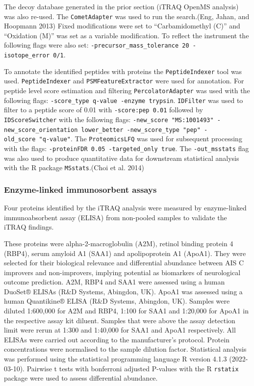 \documentclass[9pt,lineno]{elife}
\begin{document}
The decoy database generated in the prior section (iTRAQ OpenMS analysis) was also re-used.
The \texttt{CometAdapter} was used to run the search.(Eng, Jahan, and Hoopmann 2013)
Fixed modifications were set to ``Carbamidomethyl (C)'' and ``Oxidation (M)'' was set as a variable modification.
To reflect the instrument the following flags were also set: \texttt{-precursor\_mass\_tolerance\ 20\ -isotope\_error\ 0/1}.

To annotate the identified peptides with proteins the \texttt{PeptideIndexer} tool was used.
\texttt{PeptideIndexer} and \texttt{PSMFeatureExtractor} were used for annotation.
For peptide level score estimation and filtering \texttt{PercolatorAdapter} was used with the following flags: \texttt{-score\_type\ q-value\ -enzyme\ trypsin}.
\texttt{IDFilter} was used to filter to a peptide score of 0.01 with \texttt{-score:pep\ 0.01} followed by \texttt{IDScoreSwitcher} with the following flags: \texttt{-new\_score\ "MS:1001493"\ -new\_score\_orientation\ lower\_better\ -new\_score\_type\ "pep"\ -old\_score\ "q-value"}.
The \texttt{ProteomicsLFQ} was used for subsequent processing with the flags: \texttt{-proteinFDR\ 0.05\ -targeted\_only\ true}.
The \texttt{-out\_msstats} flag was also used to produce quantitative data for downstream statistical analysis with the R package \texttt{MSstats}.(Choi et al. 2014)

\clearpage

\hypertarget{enzyme-linked-immunosorbent-assays}{%
\subsubsection{Enzyme-linked immunosorbent assays}\label{enzyme-linked-immunosorbent-assays}}

Four proteins identified by the iTRAQ analysis were measured by enzyme-linked immunoabsorbent assay (ELISA) from non-pooled samples to validate the iTRAQ findings.

These proteins were alpha-2-macroglobulin (A2M), retinol binding protein 4 (RBP4), serum amyloid A1 (SAA1) and apolipoprotein A1 (ApoA1).
They were selected for their biological relevance and differential abundance between AIS C improvers and non-improvers, implying potential as biomarkers of neurological outcome prediction.
A2M, RBP4 and SAA1 were assessed using a human DuoSet® ELISAs (R\&D Systems, Abingdon, UK).
ApoA1 was assessed using a human Quantikine® ELISA (R\&D Systems, Abingdon, UK).
Samples were diluted 1:600,000 for A2M and RBP4, 1:100 for SAA1 and 1:20,000 for ApoA1 in the respective assay kit diluent.
Samples that were above the assay detection limit were rerun at 1:300 and 1:40,000 for SAA1 and ApoA1 respectively.
All ELISAs were carried out according to the manufacturer's protocol.
Protein concentrations were normalised to the sample dilution factor.
Statistical analysis was performed using the statistical programming language R version 4.1.3 (2022-03-10).
Pairwise t tests with bonferroni adjusted P-values with the R \texttt{rstatix} package were used to assess differential abundance.
\end{document}

